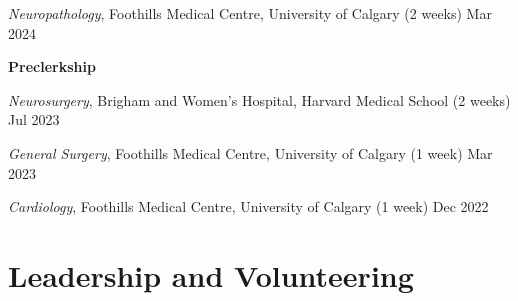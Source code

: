 \documentclass{article}
\begin{document}
\textit{Neuropathology}, Foothills Medical Centre, University of Calgary (2 weeks) \hfill Mar 2024

\vspace{1em}
\textbf{Preclerkship}

\textit{Neurosurgery}, Brigham and Women's Hospital, Harvard Medical School (2 weeks) \hfill Jul 2023

\textit{General Surgery}, Foothills Medical Centre, University of Calgary (1 week) \hfill Mar 2023

\textit{Cardiology}, Foothills Medical Centre, University of Calgary (1 week) \hfill Dec 2022


\section*{\textcolor{my_colour}{Leadership and Volunteering}}
\vspace{-.25em} \hrulefill \vspace{.25em}
\end{document}

